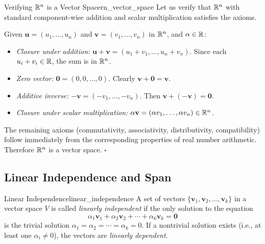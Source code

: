 \begin{example}{Verifying \texorpdfstring{$\mathbb{R}^n$}{Rn} is a Vector Space}{rn_vector_space}
Let us verify that $\mathbb{R}^n$ with standard component-wise addition and scalar multiplication satisfies the axioms.

Given $\mathbf{u} = (u_1, \ldots, u_n)$ and $\mathbf{v} = (v_1, \ldots, v_n)$ in $\mathbb{R}^n$, and $\alpha \in \mathbb{R}$:
\begin{itemize}
    \item \emph{Closure under addition:} $\mathbf{u} + \mathbf{v} = (u_1 + v_1, \ldots, u_n + v_n)$. Since each $u_i + v_i \in \mathbb{R}$, the sum is in $\mathbb{R}^n$. \checkmark
    \item \emph{Zero vector:} $\mathbf{0} = (0, 0, \ldots, 0)$. Clearly $\mathbf{v} + \mathbf{0} = \mathbf{v}$. \checkmark
    \item \emph{Additive inverse:} $-\mathbf{v} = (-v_1, \ldots, -v_n)$. Then $\mathbf{v} + (-\mathbf{v}) = \mathbf{0}$. \checkmark
    \item \emph{Closure under scalar multiplication:} $\alpha \mathbf{v} = (\alpha v_1, \ldots, \alpha v_n) \in \mathbb{R}^n$. \checkmark
\end{itemize}
The remaining axioms (commutativity, associativity, distributivity, compatibility) follow immediately from the corresponding properties of real number arithmetic. Therefore $\mathbb{R}^n$ is a vector space. $\square$
\end{example}

\subsection{Linear Independence and Span}
\label{subsec:linear_independence}

\begin{definition}{Linear Independence}{linear_independence}
A set of vectors $\{\mathbf{v}_1, \mathbf{v}_2, \ldots, \mathbf{v}_k\}$ in a vector space $V$ is called \emph{linearly independent} if the only solution to the equation
\begin{equation}
    \alpha_1 \mathbf{v}_1 + \alpha_2 \mathbf{v}_2 + \cdots + \alpha_k \mathbf{v}_k = \mathbf{0}
\end{equation}
is the trivial solution $\alpha_1 = \alpha_2 = \cdots = \alpha_k = 0$. If a nontrivial solution exists (i.e., at least one $\alpha_i \neq 0$), the vectors are \emph{linearly dependent}.
\end{definition}

